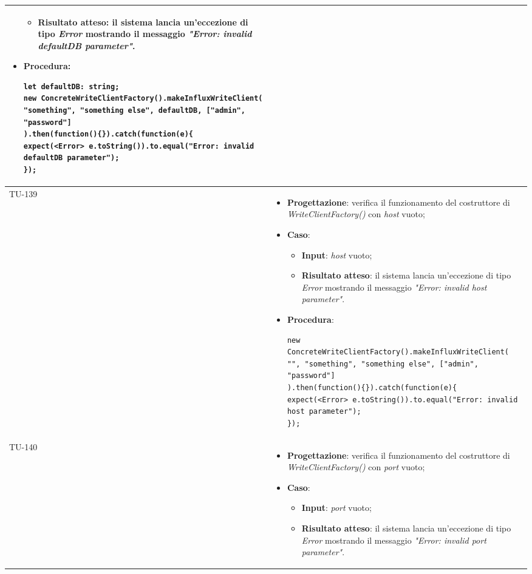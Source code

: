 \begin{longtable}{|C{1.5cm}|C{14.5cm}|}
\begin{itemize}
\begin{itemize}
		\item \textbf{Risultato atteso}: il sistema lancia un'eccezione di tipo \emph{Error} mostrando il messaggio \emph{"Error: invalid defaultDB parameter"}.
	\end{itemize}
	\item \textbf{Procedura}:
	\begin{lstlisting}
let defaultDB: string;
new ConcreteWriteClientFactory().makeInfluxWriteClient(
"something", "something else", defaultDB, ["admin", "password"]
).then(function(){}).catch(function(e){
expect(<Error> e.toString()).to.equal("Error: invalid defaultDB parameter");
});
	\end{lstlisting}
\end{itemize}\\
\hline
{TU-139} &
\begin{itemize}
	\item \textbf{Progettazione}: verifica il funzionamento del costruttore di \emph{WriteClientFactory()} con \emph{host} vuoto;
	\item \textbf{Caso}: 
	\begin{itemize}
		\item \textbf{Input}: \emph{host} vuoto;
		\item \textbf{Risultato atteso}: il sistema lancia un'eccezione di tipo \emph{Error} mostrando il messaggio \emph{"Error: invalid host parameter"}.
	\end{itemize}
	\item \textbf{Procedura}:
	\begin{lstlisting}
new ConcreteWriteClientFactory().makeInfluxWriteClient(
"", "something", "something else", ["admin", "password"]
).then(function(){}).catch(function(e){
expect(<Error> e.toString()).to.equal("Error: invalid host parameter");
});
	\end{lstlisting}
\end{itemize}\\
\hline
{TU-140} &
\begin{itemize}
	\item \textbf{Progettazione}: verifica il funzionamento del costruttore di \emph{WriteClientFactory()} con \emph{port} vuoto;
	\item \textbf{Caso}: 
	\begin{itemize}
		\item \textbf{Input}: \emph{port} vuoto;
		\item \textbf{Risultato atteso}: il sistema lancia un'eccezione di tipo \emph{Error} mostrando il messaggio \emph{"Error: invalid port parameter"}.

\end{itemize}
\end{itemize}
\end{longtable}
